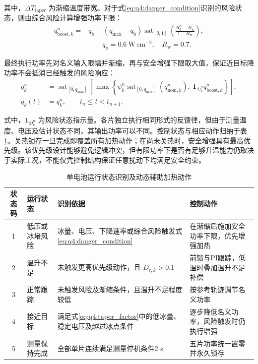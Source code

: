 \documentclass[bwprint]{gmcmthesis}
\numberwithin{figure}{section}
\begin{document}
其中，$\Delta T_{\mathrm{taper}}$ 为渐缩温度带宽。对于式\eqref{eq:q4:danger_condition}识别的风险状态，则由综合风险计算增强功率下限：
\begin{equation}
\begin{aligned}
q_{\mathrm{boost},k}^n={}&q_{\mathrm b}
+(q_{\max}-q_{\mathrm b})\operatorname{sat}_{[0,1]}\!\left(
\frac{R_k^n-R_{\mathrm w}}{1-R_{\mathrm w}}\right),
\\
&\qquad q_{\mathrm b}=0.6\ \mathrm{W\,cm^{-2}},\quad R_{\mathrm w}=0.7.
\end{aligned}
\tag{7-25}\label{eq:q4:safety_boost}
\end{equation}

最终执行功率先对名义输入限幅并渐缩，再与安全增强下限取大值，保证近目标降功率不会抵消已经触发的风险响应：
\begin{equation}
\begin{aligned}
q_k^n&=\operatorname{sat}_{[0,q_{\max}]}\!\left[
\max\!\left\{\psi_k^n\operatorname{sat}_{[0,q_{\max}]}(q_{\mathrm{nom},k}^n),
\ \boldsymbol 1_{\mathcal D_k^n}q_{\mathrm{boost},k}^n\right\}\right],
\\
q_k(t)&=q_k^n,\qquad t_n\leq t<t_{n+1}.
\end{aligned}
\tag{7-26}\label{eq:q4:applied_power}
\end{equation}

式中，$\boldsymbol 1_{\mathcal D_k^n}$ 为风险状态指示量。各片独立执行相同形式的反馈律，但由于测量温度、电压及估计状态不同，其输出功率可以不同。控制状态与相应动作归纳于表\ref{tab:q4:states}。关热锁存一旦完成即覆盖所有加热动作；在尚未关热时，安全增强具有最高优先级。该优先级设计能够避免逻辑冲突，但有限功率下是否有足够升温能力仍取决于实际工况，不能仅凭控制结构保证任意扰动下均满足安全约束。

\begin{table}[htbp]
    \centering
    \caption{单电池运行状态识别及动态辅助加热动作}
    \vspace{0.3cm}
    \label{tab:q4:states}
    \renewcommand{\arraystretch}{1.4}
    \small
    \setlength{\tabcolsep}{4pt}
    \begin{tabular}{c p{2.7cm} p{6.0cm} p{4.8cm}}
        \toprule
        \textbf{状态码} & \textbf{运行状态} & \textbf{识别依据} & \textbf{控制动作} \\
        \midrule
        1 & 低压或冰堵风险 & 冰量、电压、下降速率或综合风险触发式\eqref{eq:q4:danger_condition} & 在渐缩后施加安全功率下限，优先增强加热 \\
        2 & 温升不足 & 未触发更高优先级动作，且 $D_{r,k}>0.1$ & 前馈与PI跟踪，低温时叠加温升不足补偿 \\
        3 & 正常跟踪 & 未触发风险及渐缩条件，且温升不足程度较低 & 按参考轨迹调节名义功率 \\
        4 & 接近目标 & 满足式\eqref{eq:q4:taper_factor}中的低冰量、稳定电压及越过冰点条件 & 逐步降低名义功率，风险触发时仍执行增强 \\
        5 & 测量保持完成 & 全部单片连续满足测量停机条件2 s & 五片功率统一置零并永久锁存 \\
        \bottomrule
    \end{tabular}
\end{table}
\end{document}

